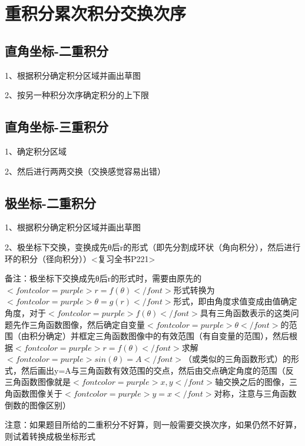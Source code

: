 \section{重积分累次积分交换次序}



\subsection{直角坐标-二重积分}

1、根据积分确定积分区域并画出草图

2、按另一种积分次序确定积分的上下限



\subsection{直角坐标-三重积分}

1、确定积分区域

2、然后进行两两交换（交换感觉容易出错）



\subsection{极坐标-二重积分}

1、根据积分确定积分区域并画出草图

2、极坐标下交换，变换成先θ后r的形式（即先分割成环状（角向积分），然后进行环的积分（径向积分））<复习全书P221>

备注：极坐标下交换成先θ后r的形式时，需要由原先的$ <font color=purple>r=f(\theta)</font> $形式转换为$ <font color=purple>\theta=g(r)</font> $形式，即由角度求值变成由值确定角度，对于$ <font color=purple>f(\theta)</font> $具有三角函数表示的这类问题先作三角函数图像，然后确定自变量$ <font color=purple>\theta</font> $的范围（由积分确定）并框定三角函数图像中的有效范围（有自变量的范围），然后根据$ <font color=purple>r=f(\theta)</font> $求解$ <font color=purple>sin(\theta)=A</font> $（或类似的三角函数形式）的形式，然后画出y=A与三角函数有效范围的交点，然后由交点确定角度的范围（反三角函数图像就是$ <font color=purple>x,y</font> $轴交换之后的图像，三角函数图像关于$ <font color=purple>y=x</font> $对称，注意与三角函数倒数的图像区别）

注意：如果题目所给的二重积分不好算，则一般需要交换次序，如果仍然不好算，则试着转换成极坐标形式

